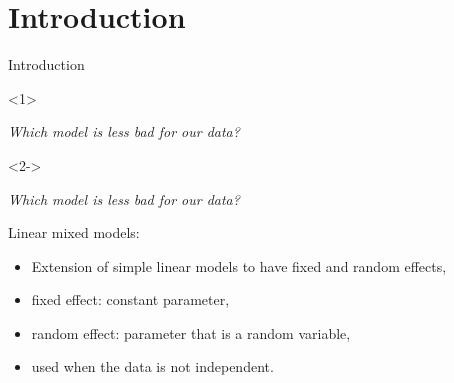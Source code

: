 \documentclass[unknownkeysallowed]{beamer}
\begin{document}
\addtocounter{framenumber}{-2}
\section{Introduction}
\label{sec:introdcution}

\begin{frame}{Introduction}
\vspace{-0.5cm}
\begin{onlyenv}<1>
\begin{center}
  \textit{Which model is less bad for our data?}  
\end{center}
\end{onlyenv}

\begin{onlyenv}<2->
\begin{center}
  \textit{Which model is less bad for our data?}  
\end{center}

Linear mixed models:

\medskip

\begin{itemize}
    \item Extension of simple linear models to have fixed and random effects,
    \item fixed effect: constant parameter,
    \item random effect: parameter that is a random variable,
    \item used when the data is not independent.
    \end{itemize}
\end{onlyenv}
\end{frame}
\end{document}
